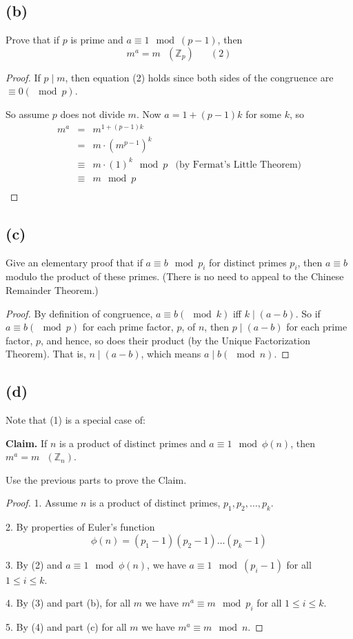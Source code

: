 \documentclass[14pt]{extarticle}
\begin{document}
\subsection{(b)}
Prove that if $p$ is prime and $a \equiv 1 \mod (p - 1)$, then
$$
m^a = m \,\,\,\,(\mathbb{Z}_p) \,\,\,\,\,\,\,\,\,\,(2)
$$
\begin{proof}
If $p \mid m$, then equation (2) holds since both sides of the congruence are $\equiv 0 (\mod p)$.

So assume $p$ does not divide $m$. Now $a = 1 + (p - 1)k$ for some $k$, so
$$
\begin{array}{cclr}
m^a & = & m^{1+(p-1)k} & \\
& = & m \cdot (m^{p-1})^k & \\
& \equiv & m \cdot (1)^k \mod p & \text{(by Fermat's Little Theorem)}\\
& \equiv & m \mod p & \\
\end{array}
$$
\end{proof}

\subsection{(c)}
Give an elementary proof that if $a \equiv b \mod p_i$ for distinct primes $p_i$, then $a \equiv b$ modulo the product of these primes. (There is no need to appeal to the Chinese Remainder Theorem.)
\begin{proof}
By definition of congruence, $a \equiv b (\mod k)$ iff $k \mid (a - b)$. So if $a \equiv b (\mod p)$ for each prime factor, $p$, of $n$, then $p \mid (a - b)$ for each prime factor, $p$, and hence, so does their product (by the Unique Factorization Theorem). That is, $n \mid (a - b)$, which means $a \mid b (\mod n)$.
\end{proof}

\subsection{(d)}
Note that (1) is a special case of:

{\bf Claim.} If $n$ is a product of distinct primes and $a \equiv 1 \mod \phi(n)$, then $m^a = m \,\,\,\,(\mathbb{Z}_n)$.

Use the previous parts to prove the Claim.
\begin{proof}
1. Assume $n$ is a product of distinct primes, $p_1, p_2, \ldots, p_k$.

2. By properties of Euler's function
$$
\phi(n) = (p_1 - 1)(p_2 - 1)\ldots(p_k - 1)
$$

3. By (2) and $a \equiv 1 \mod \phi(n)$, we have $a \equiv 1 \mod (p_i - 1)$ for all $1 \leq i \leq k$.

4. By (3) and part (b), for all $m$ we have $m^a \equiv m \mod p_i$ for all $1 \leq i \leq k$.

5. By (4) and part (c) for all $m$ we have $m^a \equiv m \mod n$.
\end{proof}
\end{document}
